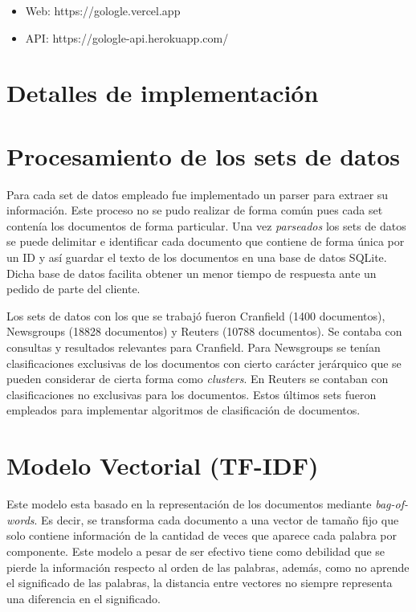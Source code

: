 \documentclass[12pt]{llncs}
\begin{document}
\begin{itemize}
  \item Web: https://gologle.vercel.app
  \item API: https://gologle-api.herokuapp.com/
\end{itemize}

\section*{Detalles de implementación}

\section{Procesamiento de los sets de datos}

Para cada set de datos empleado fue implementado un parser para extraer su información. Este proceso no se pudo realizar de forma común pues cada set contenía los documentos de forma particular. Una vez \textit{parseados} los sets de datos se puede delimitar e identificar cada documento que contiene de forma única por un ID y así guardar el texto de los documentos en una base de datos SQLite. Dicha base de datos facilita obtener un menor tiempo de respuesta ante un pedido de parte del cliente.

Los sets de datos con los que se trabajó fueron Cranfield (1400 documentos), Newsgroups (18828 documentos) y Reuters (10788 documentos). Se contaba con consultas y resultados relevantes para Cranfield. Para  Newsgroups se tenían clasificaciones exclusivas de los documentos con cierto carácter jerárquico que se pueden considerar de cierta forma como \textit{clusters}. En Reuters se contaban con clasificaciones no exclusivas para los documentos. Estos últimos sets fueron empleados para implementar algoritmos de clasificación de documentos.

\section{Modelo Vectorial (TF-IDF) \cite{conf} } 

Este modelo esta basado en la representación de los documentos mediante \textit{bag-of-words}. Es decir, se transforma cada documento a una vector de tamaño fijo que solo contiene información de la cantidad de veces que aparece cada palabra por componente. Este modelo a pesar de ser efectivo tiene como debilidad que se pierde la información respecto al orden de las palabras, además, como no aprende el significado de las palabras, la distancia entre vectores no siempre representa una diferencia en el significado. 
\end{document}
